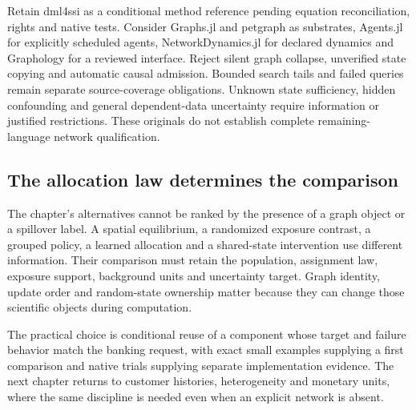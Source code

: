 Retain dml4ssi as a conditional method reference pending equation reconciliation,
rights and native tests. Consider Graphs.jl and petgraph as substrates,
Agents.jl for explicitly scheduled agents, NetworkDynamics.jl for declared
dynamics and Graphology for a reviewed interface. Reject silent graph collapse,
unverified state copying and automatic causal admission. Bounded search tails and failed queries remain separate source-coverage
obligations. Unknown state
sufficiency, hidden confounding and general dependent-data uncertainty require
information or justified restrictions. These originals do not establish
complete remaining-language network qualification.~\citep{exec25_onet_choice}

\subsection{The allocation law determines the comparison}

The chapter's alternatives cannot be ranked by the presence of a graph object
or a spillover label. A spatial equilibrium, a randomized exposure contrast,
a grouped policy, a learned allocation and a shared-state intervention use
different information. Their comparison must retain the population, assignment
law, exposure support, background units and uncertainty target. Graph identity,
update order and random-state ownership matter because they can change those
scientific objects during computation.

The practical choice is conditional reuse of a component whose target and
failure behavior match the banking request, with exact small examples supplying
a first comparison and native trials supplying separate implementation evidence.
The next chapter returns to customer histories, heterogeneity and monetary units,
where the same discipline is needed even when an explicit network is absent.

